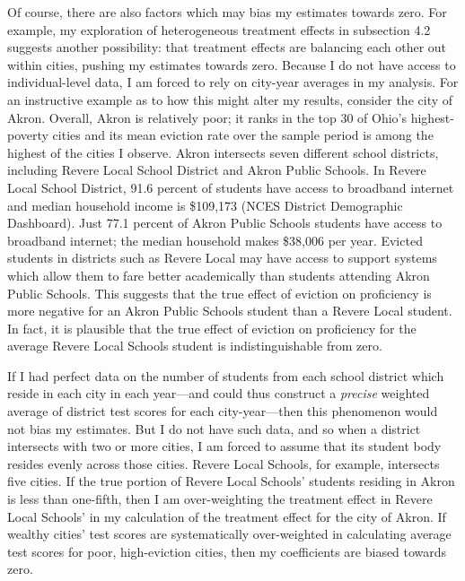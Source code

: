 \documentclass[12pt]{article}
\begin{document}
Of course, there are also factors which may bias my estimates towards zero. For example, my exploration of heterogeneous treatment effects in subsection 4.2 suggests another possibility: that treatment effects are balancing each other out within cities, pushing my estimates towards zero. Because I do not have access to individual-level data, I am forced to rely on city-year averages in my analysis. For an instructive example as to how this might alter my results, consider the city of Akron. Overall, Akron is relatively poor; it ranks in the top 30 of Ohio's highest-poverty cities and its mean eviction rate over the sample period is among the highest of the cities I observe. Akron intersects seven different school districts, including Revere Local School District and Akron Public Schools. In Revere Local School District, 91.6 percent of students have access to broadband internet and median household income is \$109,173 (NCES District Demographic Dashboard). Just 77.1 percent of Akron Public Schools students have access to broadband internet; the median household makes \$38,006 per year. Evicted students in districts such as Revere Local may have access to support systems which allow them to fare better academically than students attending Akron Public Schools. This suggests that the true effect of eviction on proficiency is more negative for an Akron Public Schools student than a Revere Local student. In fact, it is plausible that the true effect of eviction on proficiency for the average Revere Local Schools student is indistinguishable from zero. 

If I had perfect data on the number of students from each school district which reside in each city in each year—and could thus construct a \textit{precise} weighted average of district test scores for each city-year—then this phenomenon would not bias my estimates. But I do not have such data, and so when a district intersects with two or more cities, I am forced to assume that its student body resides evenly across those cities. Revere Local Schools, for example, intersects five cities. If the true portion of Revere Local Schools' students residing in Akron is less than one-fifth, then I am over-weighting the treatment effect in Revere Local Schools' in my calculation of the treatment effect for the city of Akron. If wealthy cities' test scores are systematically over-weighted in calculating average test scores for poor, high-eviction cities, then my coefficients are biased towards zero.
\end{document}
